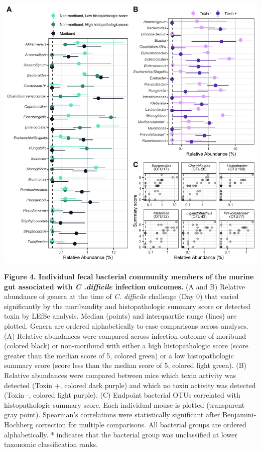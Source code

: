 \documentclass[
  12pt,
]{article}
\begin{document}
\includegraphics{../results/figures/figure_4.jpg}

\textbf{Figure 4. Individual fecal bacterial community members of the
murine gut associated with \emph{C .difficile} infection outcomes.} (A
and B) Relative abundance of genera at the time of \emph{C. difficile}
challenge (Day 0) that varied significantly by the moribundity and
histopathologic summary score or detected toxin by LEfSe analysis.
Median (points) and interquartile range (lines) are plotted. Genera are
ordered alphabetically to ease comparisons across analyses. (A) Relative
abundances were compared across infection outcome of moribund (colored
black) or non-moribund with either a high histopathologic score (score
greater than the median score of 5, colored green) or a low
histopathologic summary score (score less than the median score of 5,
colored light green). (B) Relative abundances were compared between mice
which toxin activity was detected (Toxin +, colored dark purple) and
which no toxin activity was detected (Toxin -, colored light purple).
(C) Endpoint bacterial OTUs correlated with histopathologic summary
score. Each individual mouse is plotted (transparent gray point).
Spearman's correlations were statistically significant after
Benjamini-Hochberg correction for multiple comparisons. All bacterial
groups are ordered alphabetically. * indicates that the bacterial group
was unclassified at lower taxonomic classification ranks.
\end{document}
